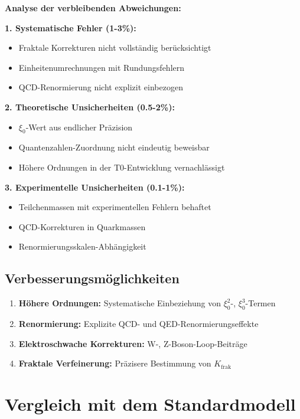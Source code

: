 \documentclass[12pt,a4paper]{article}
\begin{document}
	\begin{method}
		\textbf{Analyse der verbleibenden Abweichungen:}
		
		\textbf{1. Systematische Fehler (1-3\%):}
		\begin{itemize}
			\item Fraktale Korrekturen nicht vollständig berücksichtigt
			\item Einheitenumrechnungen mit Rundungsfehlern
			\item QCD-Renormierung nicht explizit einbezogen
		\end{itemize}
		
		\textbf{2. Theoretische Unsicherheiten (0.5-2\%):}
		\begin{itemize}
			\item $\xi_0$-Wert aus endlicher Präzision
			\item Quantenzahlen-Zuordnung nicht eindeutig beweisbar
			\item Höhere Ordnungen in der T0-Entwicklung vernachlässigt
		\end{itemize}
		
		\textbf{3. Experimentelle Unsicherheiten (0.1-1\%):}
		\begin{itemize}
			\item Teilchenmassen mit experimentellen Fehlern behaftet
			\item QCD-Korrekturen in Quarkmassen
			\item Renormierungsskalen-Abhängigkeit
		\end{itemize}
	\end{method}
	
	\subsection{Verbesserungsmöglichkeiten}
	
	\begin{enumerate}
		\item \textbf{Höhere Ordnungen:} Systematische Einbeziehung von $\xi_0^2$-, $\xi_0^3$-Termen
		\item \textbf{Renormierung:} Explizite QCD- und QED-Renormierungseffekte
		\item \textbf{Elektroschwache Korrekturen:} W-, Z-Boson-Loop-Beiträge
		\item \textbf{Fraktale Verfeinerung:} Präzisere Bestimmung von $K_{\text{frak}}$
	\end{enumerate}
	
	\section{Vergleich mit dem Standardmodell}
	
\end{document}
